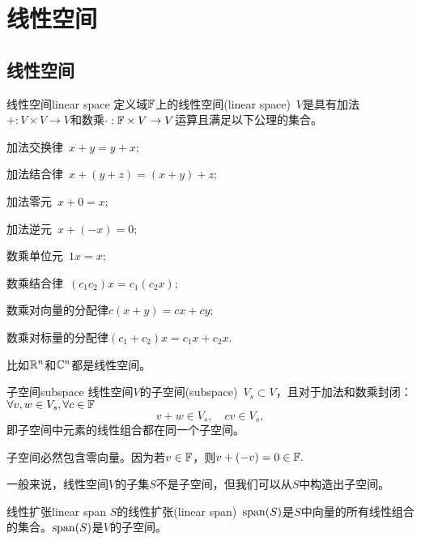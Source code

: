 \chapter{线性空间}
\section{线性空间}
\begin{definition}{线性空间}{linear space}
	定义域$\mathbb F$上的线性空间(linear space)~$V$是具有加法$+:V\times V\to V$和数乘$\cdot:\mathbb F\times V\to V$运算且满足以下公理的集合。
	\begin{compactenum}
		\item 加法交换律\qqqquad\quad~$x+y=y+x;$
		\item 加法结合律\qqqquad\quad~$x+(y+z)=(x+y)+z;$
		\item 加法零元\qqqquad\qquad~$x+0=x;$
		\item 加法逆元\qqqquad\qquad~$x+(-x)=0;$
		\item 数乘单位元\qqqquad\quad~$1x=x;$
		\item 数乘结合律\qqqquad\quad~$(c_1c_2)x=c_1(c_2x);$
		\item 数乘对向量的分配律\quad$c(x+y)=cx+cy;$
		\item 数乘对标量的分配律\quad$(c_1+c_2)x=c_1x+c_2x.$
	\end{compactenum}
\end{definition}
比如$\mathbb R^n$和$\mathbb C^n$都是线性空间。
\begin{definition}{子空间}{subspace}
	线性空间$V$的子空间(subspace)~$V_s\subset V$，且对于加法和数乘封闭：$\forall v,w\in V_s,\forall c\in\mathbb F$
	\[
		v+w\in V_s,\quad cv\in V_s,
	\]
	即子空间中元素的线性组合都在同一个子空间。
\end{definition}
子空间必然包含零向量。因为若$v\in\mathbb F$，则$v+(-v)=0\in\mathbb F.$

一般来说，线性空间$V$的子集$S$不是子空间，但我们可以从$S$中构造出子空间。

\begin{definition}{线性扩张}{linear span}
	$S$的线性扩张(linear span)~$\operatorname{span}(S)$是$S$中向量的所有线性组合的集合。$\operatorname{span}(S)$是$V$的子空间。
\end{definition}
